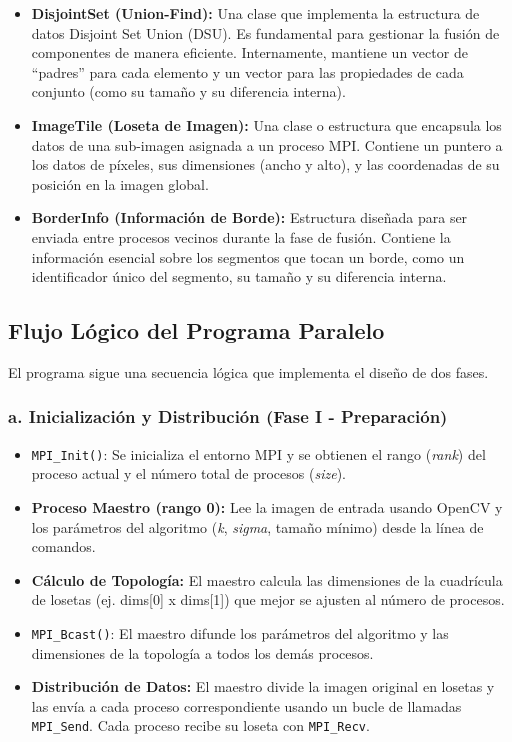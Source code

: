 \documentclass[fleqn,10pt]{article}
\begin{document}
\begin{itemize}
    \item \textbf{DisjointSet (Union-Find):} Una clase que implementa la estructura de datos Disjoint Set Union (DSU). Es fundamental para gestionar la fusión de componentes de manera eficiente. Internamente, mantiene un vector de ``padres'' para cada elemento y un vector para las propiedades de cada conjunto (como su tamaño y su diferencia interna).
    \item \textbf{ImageTile (Loseta de Imagen):} Una clase o estructura que encapsula los datos de una sub-imagen asignada a un proceso MPI. Contiene un puntero a los datos de píxeles, sus dimensiones (ancho y alto), y las coordenadas de su posición en la imagen global.
    \item \textbf{BorderInfo (Información de Borde):} Estructura diseñada para ser enviada entre procesos vecinos durante la fase de fusión. Contiene la información esencial sobre los segmentos que tocan un borde, como un identificador único del segmento, su tamaño y su diferencia interna.
\end{itemize}

\subsection{Flujo Lógico del Programa Paralelo}
El programa sigue una secuencia lógica que implementa el diseño de dos fases.

\subsubsection*{a. Inicialización y Distribución (Fase I - Preparación)}
\begin{itemize}
    \item \texttt{MPI\_Init()}: Se inicializa el entorno MPI y se obtienen el rango (\textit{rank}) del proceso actual y el número total de procesos (\textit{size}).
    \item \textbf{Proceso Maestro (rango 0):} Lee la imagen de entrada usando OpenCV y los parámetros del algoritmo (\textit{k}, \textit{sigma}, tamaño mínimo) desde la línea de comandos.
    \item \textbf{Cálculo de Topología:} El maestro calcula las dimensiones de la cuadrícula de losetas (ej. dims[0] x dims[1]) que mejor se ajusten al número de procesos.
    \item \texttt{MPI\_Bcast()}: El maestro difunde los parámetros del algoritmo y las dimensiones de la topología a todos los demás procesos.
    \item \textbf{Distribución de Datos:} El maestro divide la imagen original en losetas y las envía a cada proceso correspondiente usando un bucle de llamadas \texttt{MPI\_Send}. Cada proceso recibe su loseta con \texttt{MPI\_Recv}.
\end{itemize}
\end{document}
